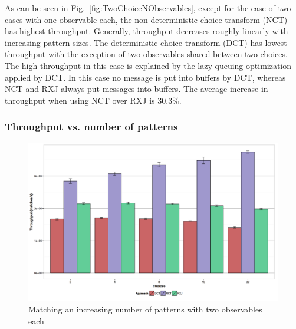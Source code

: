\documentclass[runningheads]{llncs}
\begin{document}
\begin{sloppypar}
As can be seen in Fig.~\ref{fig:TwoChoiceNObservables}, except for the case
of two cases with one observable each, the non-deterministic choice transform
(NCT) has highest throughput. Generally, throughput decreases roughly linearly
with increasing pattern sizes. The deterministic choice transform (DCT) has
lowest throughput with the exception of two observables shared between two
choices. The high throughput in this case is explained by the lazy-queuing
optimization applied by DCT. In this case no message is put into buffers by
DCT, whereas NCT and RXJ always put messages into buffers. The average
increase in throughput when using NCT over RXJ is 30.3\%.

\subsubsection{Throughput vs. number of patterns}

\begin{figure}[h]
  \centering
  \includegraphics[scale=0.30]{img/N-patterns-two-observables.pdf}
  \caption{Matching an increasing number of patterns with two observables each}
  \label{fig:NChoiceTwoObservables}
\end{figure}





\end{sloppypar}
\end{document}

